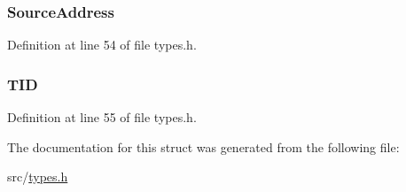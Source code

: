 \subsubsection[{Source\+Address}]{ Source\+Address}\label{struct_in_pack___type_def_adf5bc4e40bad06fdd0c2b4e48f18831b}


Definition at line 54 of file types.\+h.

\hypertarget{struct_in_pack___type_def_ad1076cc9b9c0e86656584b48e443d884}{}
\subsubsection[{T\+I\+D}]{ T\+I\+D}\label{struct_in_pack___type_def_ad1076cc9b9c0e86656584b48e443d884}


Definition at line 55 of file types.\+h.



The documentation for this struct was generated from the following file\+:\begin{DoxyCompactItemize}
\item 
src/\hyperlink{types_8h}{types.\+h}\end{DoxyCompactItemize}
